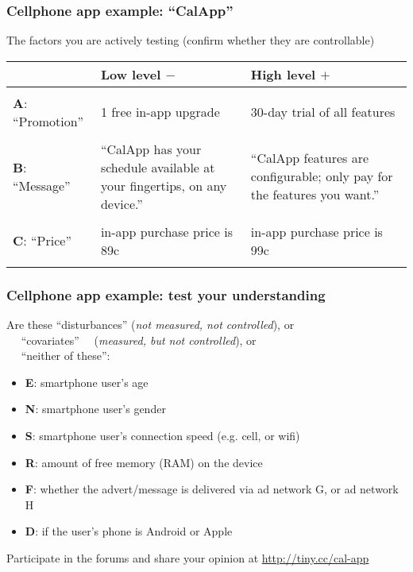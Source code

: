 \begin{frame}\frametitle{Cellphone app example: ``CalApp''}	
	
			{\color{myOrange} The factors you are actively testing} {\small (confirm whether they are controllable)}
			\vspace{12pt}
			
			\begin{tabulary}{\linewidth}{l|ll}\hline
				& \textbf{\relax Low level $-$} & \textbf{\relax High level $+$}\\ \hline  \\
				\textbf{A}: ``Promotion'' & 1 free in-app upgrade & 30-day trial of all features\\ \\
				\textbf{B}: ``Message'' & \parbox[t]{5.cm}{``CalApp has your schedule available at your fingertips, on any device.''} & \parbox[t]{5.5cm}{``CalApp features are configurable; only pay for the features you want.''} \\ \\
				\textbf{C}: ``Price'' & in-app purchase price is 89c &  in-app purchase price is 99c  \\& \\\hline
			\end{tabulary}	
\end{frame}

\begin{frame}\frametitle{Cellphone app example: test your understanding}
	
	
	Are these ``disturbances'' (\emph{not measured, not controlled}), or \\
	\qquad\quad\,\,\,\,\,\, ``covariates'' \,\,\,\, (\emph{measured, but not controlled}), or \\
	\qquad\quad\,\,\,\,\,\, ``neither of these'':
	
	\vspace{0.5cm}
	
	\begin{itemize}
		\item	\textbf{E}: smartphone user's age
		\item	\textbf{N}: smartphone user's gender
		\item	\textbf{S}: smartphone user's connection speed (e.g. cell, or wifi)
		\item	\textbf{R}: amount of free memory (RAM) on the device
		\item	\textbf{F}: whether the advert/message is delivered via ad network G, or ad network H
		\item	\textbf{D}: if the user's phone is Android or Apple		
	\end{itemize}
	
	\vspace{0.5cm}
	
	Participate in the forums and share your opinion at \href{http://tiny.cc/cal-app}{http://tiny.cc/cal-app}
\end{frame}